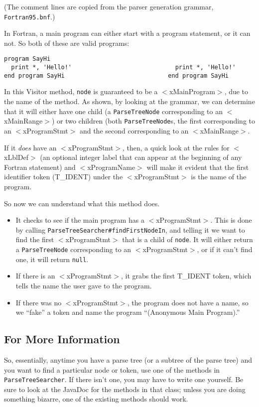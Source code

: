 (The comment lines are copied from the parser generation grammar, \texttt{Fortran95.bnf}.)

In Fortran, a main program can either start with a program statement, or it
can not.  So both of these are valid programs:
\begin{verbatim}
program SayHi
  print *, 'Hello!'                             print *, 'Hello!'
end program SayHi                             end program SayHi
\end{verbatim}

In this Visitor method, \texttt{node} is guaranteed to be a $<$xMainProgram$>$,
due to the name of the method.  As shown, by looking at the grammar, we can
determine that it will either have one child (a \texttt{ParseTreeNode} corresponding
to an $<$xMainRange$>$) or two children (both \texttt{ParseTreeNode}s, the
first corresponding to an $<$xProgramStmt$>$ and the second corresponding to
an $<$xMainRange$>$.

If it \textit{does} have an $<$xProgramStmt$>$, then, a quick look at the rules for
$<$xLblDef$>$ (an optional integer label that can appear at the beginning of any
Fortran statement) and $<$xProgramName$>$ will make it evident that the first
identifier token (T\_IDENT) under the $<$xProgramStmt$>$ is the name of the program.

So now we can understand what this method does.
\begin{itemize}

\item It checks to see if the main program has a $<$xProgramStmt$>$.  This is done
by calling \texttt{ParseTreeSearcher\#findFirstNodeIn}, and telling it we want to
find the first $<$xProgramStmt$>$ that is a child of \texttt{node}.  It will either
return a \texttt{ParseTreeNode} corresponding to an $<$xProgramStmt$>$, or if it
can't find one, it will return \texttt{null}.

\item If there is an $<$xProgramStmt$>$, it grabs the first T\_IDENT token, which
tells the name the user gave to the program.

\item If there was no $<$xProgramStmt$>$, the program does not have a name, so we
``fake'' a token and name the program ``(Anonymous Main Program).''
\end{itemize}

\subsection{For More Information}

So, essentially, anytime you have a parse tree (or a subtree of the parse tree)
and you want to find a particular node or token, use one of the methods in
\texttt{ParseTreeSearcher}.  If there isn't one, you may have to write one yourself.
Be sure to look at the JavaDoc for the methods in that class; unless you are
doing something bizarre, one of the existing methods should work.
